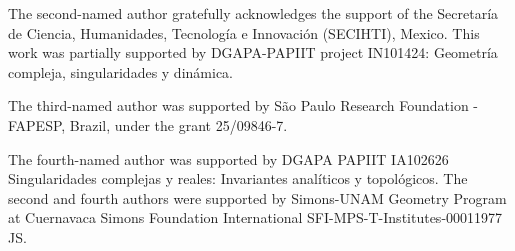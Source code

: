 \documentclass[11pt]{amsart}
\theoremstyle{definition}
\begin{document}
The second-named author gratefully acknowledges the support of the
Secretaría de Ciencia, Humanidades, Tecnología e Innovación
(SECIHTI), Mexico. This work was partially supported by
DGAPA-PAPIIT project IN101424: Geometría compleja,
singularidades y dinámica.

The third-named author was supported by São Paulo Research Foundation - FAPESP, Brazil, under the grant 25/09846-7.

The fourth-named author was supported by DGAPA PAPIIT IA102626 Singularidades complejas y reales: Invariantes analíticos y topológicos. The second and fourth authors were supported by Simons-UNAM Geometry Program at Cuernavaca Simons Foundation International SFI-MPS-T-Institutes-00011977 JS. 



\end{document}
